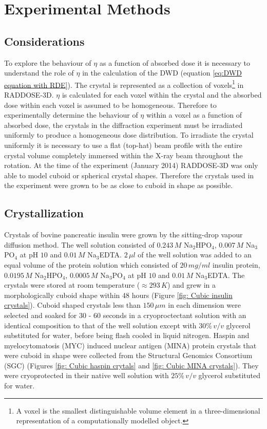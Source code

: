 \section{Experimental Methods}
\label{sec:Experimental Methods}

\subsection{Considerations}
\label{sub:Considerations}
To explore the behaviour of $\eta$ as a function of absorbed dose it is necessary to understand the role of $\eta$ in the calculation of the DWD (equation \ref{eq:DWD equation with RDE}).
The crystal is represented as a collection of voxels\footnote{A voxel is the smallest distinguishable volume element in a three-dimensional representation of a computationally modelled object.} in RADDOSE-3D.
$\eta$ is calculated for each voxel within the crystal and the absorbed dose within each voxel is assumed to be homogeneous.
Therefore to experimentally determine the behaviour of $\eta$ within a voxel as a function of absorbed dose, the crystals in the diffraction experiment must be irradiated uniformly to produce a homogeneous dose distribution.
To irradiate the crystal uniformly it is necessary to use a flat (top-hat) beam profile with the entire crystal volume completely immersed within the X-ray beam throughout the rotation.
At the time of the experiment (January 2014) RADDOSE-3D was only able to model cuboid or spherical crystal shapes.
Therefore the crystals used in the experiment were grown to be as close to cuboid in shape as possible.

\subsection{Crystallization}
\label{sub:Crystallisation}
Crystals of bovine pancreatic insulin were grown by the sitting-drop vapour diffusion method.
The well solution consisted of $0.243\, M$ Na$_2$HPO$_4$, $0.007\, M$ Na$_3$PO$_4$ at pH $10$ and $0.01\, M$ Na$_3$EDTA.
$2\, \mu l$ of the well solution was added to an equal volume of the protein solution which consisted of $20\, mg/ml$ insulin protein, $0.0195\, M$ Na$_2$HPO$_4$, $0.0005\, M$ Na$_3$PO$_4$ at pH $10$ and $0.01\, M$ Na$_3$EDTA.
The crystals were stored at room temperature ($\approx 293\, K$) and grew in a morphologically cuboid shape within 48 hours (Figure \ref{fig: Cubic insulin crystals}).
Cuboid shaped crystals less than $150\, \mu m$ in each dimension were selected and soaked for 30 - 60 seconds in a cryoproctectant solution with an identical composition to that of the well solution except with $30\%\, v/v$ glycerol substituted for water, before being flash cooled in liquid nitrogen.
\newline
Haspin and myelocytomatosis (MYC) induced nuclear antigen (MINA) protein crystals that were cuboid in shape were collected from the Structural Genomics Consortium (SGC) (Figures \ref{fig: Cubic haspin crytals} and \ref{fig: Cubic MINA crystals}).
They were cryoprotected in their native well solution with $25\%\, v/v$ glycerol substituted for water.


